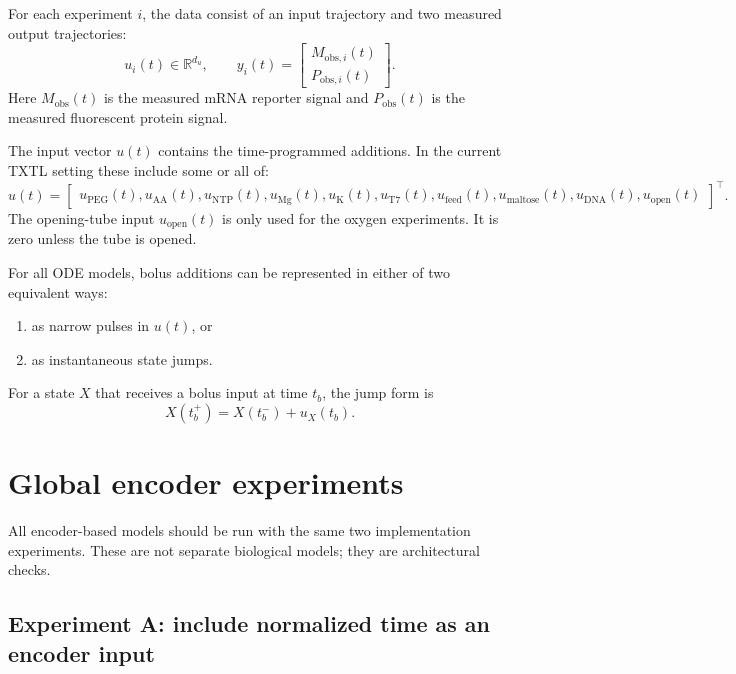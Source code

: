 \documentclass[11pt]{article}
\newcommand{\obs}{\mathrm{obs}}
\newcommand{\open}{\mathrm{open}}
\begin{document}
For each experiment $i$, the data consist of an input trajectory and two measured output trajectories:
\begin{equation}
    u_i(t) \in \mathbb{R}^{d_u},
    \qquad
    y_i(t)=
    \begin{bmatrix}
        M_{\obs,i}(t) \\
        P_{\obs,i}(t)
    \end{bmatrix}.
\end{equation}
Here $M_{\obs}(t)$ is the measured mRNA reporter signal and $P_{\obs}(t)$ is the measured fluorescent protein signal.

The input vector $u(t)$ contains the time-programmed additions. In the current TXTL setting these include some or all of:
\begin{equation}
    u(t)=
    \begin{bmatrix}
        u_{\mathrm{PEG}}(t),
        u_{\mathrm{AA}}(t),
        u_{\mathrm{NTP}}(t),
        u_{\mathrm{Mg}}(t),
        u_{\mathrm{K}}(t),
        u_{\mathrm{T7}}(t),
        u_{\mathrm{feed}}(t),
        u_{\mathrm{maltose}}(t),
        u_{\mathrm{DNA}}(t),
        u_{\open}(t)
    \end{bmatrix}^{\top}.
\end{equation}
The opening-tube input $u_{\open}(t)$ is only used for the oxygen experiments. It is zero unless the tube is opened.

For all ODE models, bolus additions can be represented in either of two equivalent ways:
\begin{enumerate}[leftmargin=*]
    \item as narrow pulses in $u(t)$, or
    \item as instantaneous state jumps.
\end{enumerate}
For a state $X$ that receives a bolus input at time $t_b$, the jump form is
\begin{equation}
    X(t_b^+) = X(t_b^-) + u_X(t_b).
\end{equation}

\section{Global encoder experiments}
\label{sec:global_encoder_experiments}

All encoder-based models should be run with the same two implementation experiments. These are not separate biological models; they are architectural checks.

\subsection{Experiment A: include normalized time as an encoder input}
\end{document}
